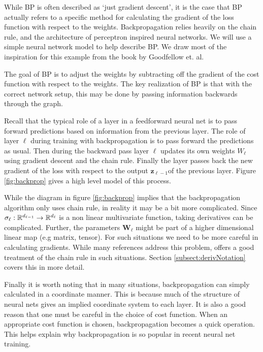 While BP is often described as `just gradient descent', it is the case that BP actually refers to a specific method for calculating the gradient of the loss function with respect to the weights.  Backpropagation relies heavily on the chain rule, and the architecture of perceptron inspired neural networks. We will use a simple neural network model to help describe BP.  We draw most of the inspiration for this example from the book by Goodfellow  et. al. \cite[ch6.5]{Goodfellow-et-al-2016}

The goal of BP is to adjust the weights by subtracting off the gradient of the cost function with respect to the weights.  The key realization of BP is that with the correct network setup, this may be done by passing information backwards through the graph.  

Recall that the typical role of a layer in a feedforward neural net is to pass forward predictions based on information from the previous layer.  The role of layer \( \ell \) during training with backpropagation is to pass forward the predictions as usual. Then during the backward pass layer \( \ell \) updates its own weights \( W_{\ell} \) using gradient descent and the chain rule. Finally the layer passes back the new gradient of the loss with respect to the output \( \bm z_{\ell-1} \)of the previous layer.  Figure \ref{fig:backprop} gives a high level model of this process.



While the diagram in figure \ref{fig:backprop} implies that the backpropagation algorithm only uses chain rule, in reality it may be a bit more complicated.  Since \( \sigma_{\ell}:\mathbb R^{d_{\ell-1}}\rightarrow \mathbb R^{d_{\ell}}\) is a non linear multivariate function, taking derivatives can be complicated.  Further, the parameters \( \bm W_{\ell} \) might be part of a higher dimensional linear map (e.g matrix, tensor). For such situations we need to be more careful in calculating gradients.  While many references address this problem, \cite{matGradChain} offers a good treatment of the chain rule in such situations. Section \ref{subsect:derivNotation} covers this in more detail.

Finally it is worth noting that in many situations, backpropagation can simply calculated in a coordinate manner.  This is because much of the structure of neural nets gives an implied coordinate system to each layer.  It is also a good reason that one must be careful in the choice of cost function. When an appropriate cost function is chosen, backpropagation becomes a quick operation. This helps explain why backpropagation is so popular in recent neural net training.